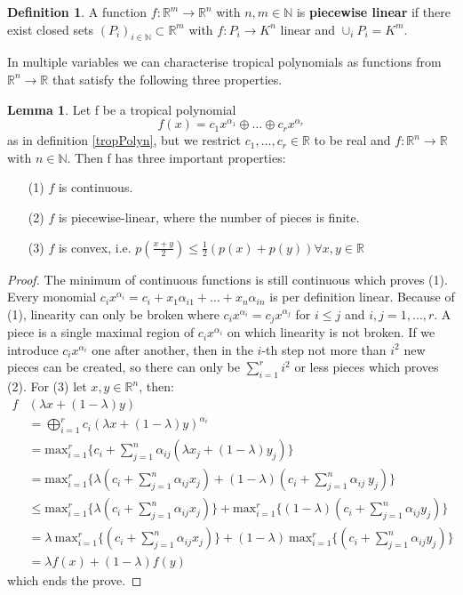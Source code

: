 \documentclass{article}
\theoremstyle{definition}
\newtheorem{lemma}[theorem]{Lemma}
\newtheorem{definition}[theorem]{Definition}
\begin{document}
\begin{definition}
A function $f : \mathbb{R}^{m} \to \mathbb{R}^{n}$ with $n, m \in \mathbb{N}$ is \textbf{piecewise linear} if there exist closed sets $(P_{i})_{i \in \mathbb{N}} \subset \mathbb{R}^{m}$ with $f : P_{i} \to K^{n}$ linear and $\cup_{i}P_{i} = K^{m}$.
\end{definition}

In multiple variables we can characterise tropical polynomials as functions from $\mathbb{R}^{n} \to \mathbb{R}$ that satisfy the following three properties.

\begin{lemma}\label{lemma:trop_properties}
Let f be a tropical polynomial
$$ f(x) = c_1 x^{\alpha_1} \oplus \dots \oplus c_r x^{\alpha_r}$$ as in definition \ref{tropPolyn}, but we restrict $c_1, \dots , c_r \in \mathbb{R}$ to be real and $f: \mathbb{R}^{n} \to \mathbb{R}$ with $n \in \mathbb{N}$. Then f has three important properties:
\begin{itemize}
\item[(1)]
$f$ is continuous.
\item[(2)]
$f$ is piecewise-linear, where the number of pieces is finite.
\item[(3)]
$f$ is convex, i.e. $p(\frac{x + y}{2}) \leq \frac{1}{2}(p(x)+p(y)) \forall x,y \in \mathbb{R}$
\end{itemize}
\end{lemma}

\begin{proof}
The minimum of continuous functions is still continuous which proves (1). Every monomial $c_ix^{\alpha_i} = c_i + x_{1}\alpha_{i1} + \dots + x_n \alpha_{in}$ is per definition linear. Because of (1), linearity can only be broken where $c_i x^{\alpha_i} = c_j x^{\alpha_j}$ for $i \leq j$ and $i,j = 1, \dots ,r$. A piece is a single maximal region of $c_ix^{\alpha_i}$ on which linearity is not broken. If we introduce $c_ix^{\alpha_i}$ one after another, then in the $i$-th step not more than $i^2$ new pieces can be created, so there can only be $ \sum_{i=1}^{r} i^2$ or less pieces which proves (2). 
For (3) let $x, y \in \mathbb{R}^{n}$, then:
\begin{align*}
f&(\lambda x + (1-\lambda)y) \\
&= \bigoplus^{r}_{i=1} c_{i}(\lambda x + (1-\lambda) y)^{\alpha_{i}} \\
&= \text{max}^{r}_{i=1} \{ c_{i} + \sum_{j=1}^{n} \alpha_{ij}(\lambda x_{j} + (1-\lambda) y_{j}) \} \\
&= \text{max}^{r}_{i=1} \{ \lambda (c_{i} + \sum_{j=1}^{n}\alpha_{ij}x_{j}) + (1-\lambda) (c_{i} + \sum_{j=1}^{n}\alpha_{ij} \ y_{j})\} \\
&\leq \text{max}^{r}_{i=1} \{ \lambda (c_{i} + \sum_{j=1}^{n}\alpha_{ij}x_{j}) \} + \text{max}^{r}_{i=1} \{ (1-\lambda) (c_{i} + \sum_{j=1}^{n}\alpha_{ij}y_{j}) \} \\
&= \lambda \ \text{max}^{r}_{i=1} \{ (c_{i} + \sum_{j=1}^{n}\alpha_{ij}x_{j}) \} + (1-\lambda) \ \text{max}^{r}_{i=1} \{ (c_{i} + \sum_{j=1}^{n}\alpha_{ij}y_{j}) \} \\
&= \lambda f(x) + (1-\lambda) f(y)
\end{align*}
which ends the prove.
\end{proof}
\end{document}
